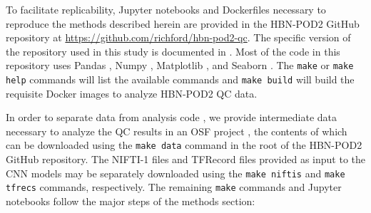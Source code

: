 \documentclass[fleqn,10pt,inline]{wlscirep}
\begin{document}
To facilitate replicability, Jupyter notebooks \cite{kluyver2016jupyter} and
Dockerfiles \cite{merkel2014docker} necessary to reproduce the methods described
herein are provided in the HBN-POD2 GitHub repository at
\url{https://github.com/richford/hbn-pod2-qc}. The specific version of the
repository used in this study is documented in \cite{richiehalford2022hbnpod2qc}.
Most of the code in this repository uses Pandas \cite{mckinney-proc-scipy-2010,reback2020pandas}, Numpy \cite{harris2020array}, Matplotlib \cite{hunter2007matplotlib}, and Seaborn \cite{waskom2021seaborn}.
The \texttt{make} or \texttt{make help} commands will list the available commands and \texttt{make build} will build the requisite Docker images to analyze HBN-POD2 QC data.

In order to separate data from analysis code \cite{Wilson2017-rj}, we provide intermediate data necessary to analyze the QC results in an OSF \cite{Foster-MSLS2017-rl} project \cite{hbn-pod2-osf}, the contents of which can be downloaded using the \texttt{make data} command in the root of the HBN-POD2 GitHub repository. The NIFTI-1 files and TFRecord files provided as input to the CNN models may be separately downloaded using the \texttt{make niftis} and \texttt{make tfrecs} commands, respectively. The remaining \texttt{make} commands and Jupyter notebooks follow the major steps of the methods section:
\end{document}
